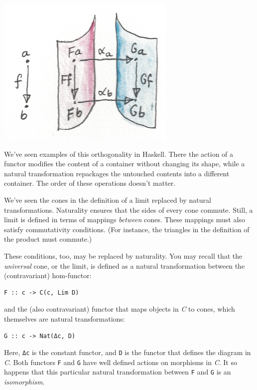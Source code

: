 \includegraphics{images/sheets.png}

We've seen examples of this orthogonality in Haskell. There the action
of a functor modifies the content of a container without changing its
shape, while a natural transformation repackages the untouched contents
into a different container. The order of these operations doesn't
matter.

We've seen the cones in the definition of a limit replaced by natural
transformations. Naturality ensures that the sides of every cone
commute. Still, a limit is defined in terms of mappings \emph{between}
cones. These mappings must also satisfy commutativity conditions. (For
instance, the triangles in the definition of the product must commute.)

These conditions, too, may be replaced by naturality. You may recall
that the \emph{universal} cone, or the limit, is defined as a natural
transformation between the (contravariant) hom-functor:

\begin{verbatim}
F :: c -> C(c, Lim D)
\end{verbatim}

and the (also contravariant) functor that maps objects in \emph{C} to
cones, which themselves are natural transformations:

\begin{verbatim}
G :: c -> Nat(Δc, D)
\end{verbatim}

Here, \texttt{Δc} is the constant functor, and \texttt{D} is the functor
that defines the diagram in \emph{C}. Both functors \texttt{F} and
\texttt{G} have well defined actions on morphisms in \emph{C}. It so
happens that this particular natural transformation between \texttt{F}
and \texttt{G} is an \emph{isomorphism}.

